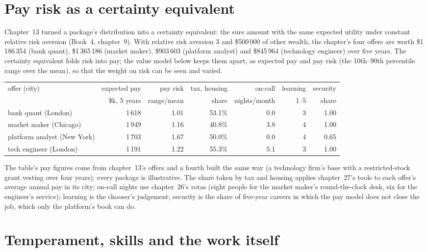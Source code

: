 \section{Pay risk as a certainty equivalent}

Chapter~13 turned a package's distribution into a certainty equivalent: the sure amount with the same expected utility
under constant relative risk aversion (Book~4, chapter~9). With relative risk aversion 3 and \$500\,000 of other wealth,
the chapter's four offers are worth \$1\,186\,354 (bank quant), \$1\,365\,186 (market maker), \$903\,603 (platform
analyst) and \$845\,964 (technology engineer) over five years. The certainty equivalent folds risk into pay; the value
model below keeps them apart, as expected pay and pay risk (the 10th--90th percentile range over the mean), so that the
weight on risk can be seen and varied.

\begin{center}\footnotesize\setlength{\tabcolsep}{4pt}
\begin{tabular}{@{}lrrrrrr@{}}
\toprule
offer (city) & expected pay & pay risk & tax, housing & on-call & learning & security\\
 & \$k, 5 years & range/mean & share & nights/month & 1--5 & share\\
\midrule
bank quant (London) & 1\,618 & 1.01 & 53.1\% & 0.0 & 3 & 1.00\\
market maker (Chicago) & 1\,949 & 1.16 & 40.8\% & 3.8 & 4 & 1.00\\
platform analyst (New York) & 1\,703 & 1.67 & 50.0\% & 0.0 & 4 & 0.65\\
tech engineer (London) & 1\,191 & 1.22 & 55.3\% & 5.1 & 3 & 1.00\\
\bottomrule
\end{tabular}
\end{center}

The table's pay figures come from chapter~13's offers and a fourth built the same way (a technology firm's base with a
restricted-stock grant vesting over four years); every package is illustrative. The share taken by tax and housing
applies chapter~27's tools to each offer's average annual pay in its city; on-call nights use chapter~26's rotas
(eight people for the market maker's round-the-clock desk, six for the engineer's service); learning is the chooser's
judgement; security is the share of five-year careers in which the pay model does not close the job, which only the
platform's book can do.

\section{Temperament, skills and the work itself}

